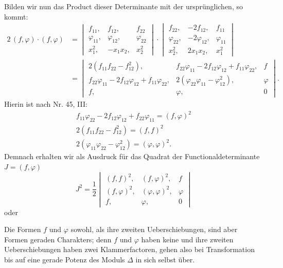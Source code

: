 Bilden wir nun das Product dieser Determinante mit der ursprünglichen, so kommt:
\[
\begin{aligned}
2\,(f, \varphi)\cdot(f, \varphi) &= \begin{vmatrix} f_{11}, & f_{12}, & f_{22} \\ \varphi_{11}, & \varphi_{12}, & \varphi_{22} \\ x_1^2, & -x_1x_2, & x_2^2 \end{vmatrix} \cdot \begin{vmatrix} f_{22}, & -2f_{12}, & f_{11} \\ \varphi_{22}, & -2\varphi_{12}, & \varphi_{11} \\ x_2^2, & 2x_1x_2, & x_1^2 \end{vmatrix} \\
&= \begin{vmatrix} 2(f_{11}f_{22} - f_{12}^2), & f_{22}\varphi_{11} - 2f_{12}\varphi_{12} + f_{11}\varphi_{22}, & f \\ f_{22}\varphi_{11} - 2f_{12}\varphi_{12} + f_{11}\varphi_{22}, & 2(\varphi_{22}\varphi_{11} - \varphi_{12}^2), & \varphi \\ f, & \varphi, & 0 \end{vmatrix}.
\end{aligned}
\]
Hierin ist nach Nr. 45, III:
\[
\begin{array}{l}
f_{11}\varphi_{22} - 2f_{12}\varphi_{12} + f_{22}\varphi_{11} = (f, \varphi)^2 \\
2(f_{11}f_{22} - f_{12}^2) = (f, f)^2 \\
2(\varphi_{11}\varphi_{22} - \varphi_{12}^2) = (\varphi, \varphi)^2.
\end{array}
\]
Demnach erhalten wir als Ausdruck für das Quadrat der Functionaldeterminante $J = (f, \varphi)$
\[
J^2 = \frac{1}{2} \begin{vmatrix} (f, f)^2, & (f, \varphi)^2, & f \\ (f, \varphi)^2, & (\varphi, \varphi)^2, & \varphi \\ f, & \varphi, & 0 \end{vmatrix}
\]
oder

Die Formen $f$ und $\varphi$ sowohl, als ihre zweiten Ueberschiebungen, sind aber Formen geraden Charakters; denn $f$ und $\varphi$ haben keine und ihre zweiten Ueberschiebungen haben zwei Klammerfactoren, gehen also bei Transformation bis auf eine gerade Potenz des Moduls $\Delta$ in sich selbst über.

